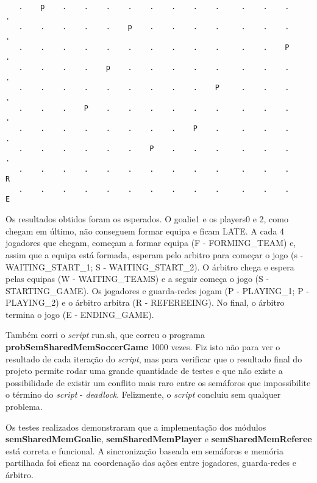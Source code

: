 \documentclass[code,math]{relatorio-deti}
\begin{document}
\begin{verbatim}
   .    p    .    .    .    .    .    .    .    .     .    .    .     . 
   .    .    .    .    .    p    .    .    .    .     .    .    .     . 
   .    .    .    .    .    .    .    .    .    .     .    .    P     . 
   .    .    .    .    p    .    .    .    .    .     .    .    .     . 
   .    .    .    .    .    .    .    .    .    P     .    .    .     . 
   .    .    .    P    .    .    .    .    .    .     .    .    .     . 
   .    .    .    .    .    .    .    .    P    .     .    .    .     . 
   .    .    .    .    .    .    P    .    .    .     .    .    .     . 
   .    .    .    .    .    .    .    .    .    .     .    .    .     R 
   .    .    .    .    .    .    .    .    .    .     .    .    .     E 
\end{verbatim}

Os resultados obtidos foram os esperados. O goalie1 e os players0 e 2, como chegam em último, não conseguem formar equipa e ficam LATE. A cada 4 jogadores que chegam, começam a formar equipa (F - FORMING\_TEAM) e, assim que a equipa está formada, esperam pelo arbitro para começar o jogo (s - WAITING\_START\_1; S - WAITING\_START\_2). O árbitro chega e espera pelas equipas (W - WAITING\_TEAMS) e a seguir começa o jogo (S - STARTING\_GAME). Os jogadores e guarda-redes jogam (P - PLAYING\_1; P - PLAYING\_2) e o árbitro arbitra (R - REFEREEING). No final, o árbitro termina o jogo (E - ENDING\_GAME).

Também corri o \textit{script} run.sh, que correu o programa \textbf{probSemSharedMemSoccerGame} 1000 vezes. Fiz isto não para ver o resultado de cada iteração do \textit{script}, mas para verificar que o resultado final do projeto permite rodar uma grande quantidade de testes e que não existe a possibilidade de existir um conflito mais raro entre os semáforos que impossibilite o término do \textit{script} - \textit{deadlock}. Felizmente, o \textit{script} concluiu sem qualquer problema. 

Os testes realizados demonstraram que a implementação dos módulos \textbf{semSharedMemGoalie}, \textbf{semSharedMemPlayer} e \textbf{semSharedMemReferee} está correta e funcional. A sincronização baseada em semáforos e memória partilhada foi eficaz na coordenação das ações entre jogadores, guarda-redes e árbitro.
\end{document}

